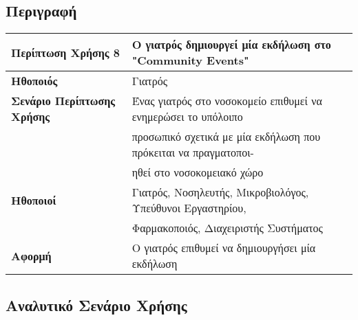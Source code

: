 \documentclass{article}
\newcommand\T{\rule{0pt}{2.6ex}}       %
\newcommand\B{\rule[-1.2ex]{0pt}{0pt}}
\begin{document}
\subsection{Περιγραφή}

\begin{center}
     \begin{tabular}{|l|l|}
     \hline
      \textbf{Περίπτωση Χρήσης 8} & Ο γιατρός δημιουργεί μία εκδήλωση στο "Community Events" \T\B \\ 
      \hline
      \textbf{Ηθοποιός} & Γιατρός \T\B \\
      \hline
      \textbf{Σενάριο Περίπτωσης Χρήσης} & Ένας γιατρός στο νοσοκομείο επιθυμεί να ενημερώσει το υπόλοιπο\T\\& προσωπικό σχετικά με μία εκδήλωση  που πρόκειται να πραγματοποι- \\& ηθεί στο νοσοκομειακό χώρο \B \\
      \hline
      \textbf{Ηθοποιοί} & Γιατρός, Νοσηλευτής, Μικροβιολόγος, Υπεύθυνοι Εργαστηρίου, \T \\& Φαρμακοποιός, Διαχειριστής Συστήματος \B \\
      \hline
      \textbf{Αφορμή} &  Ο γιατρός επιθυμεί να δημιουργήσει μία εκδήλωση\T\B \\
      \hline
     \end{tabular}
 \end{center}
 
  \subsection{Αναλυτικό Σενάριο Χρήσης}
\end{document}
